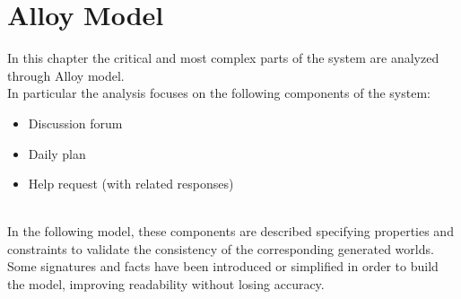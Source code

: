 \section{Alloy Model}

In this chapter the critical and most complex parts of the system are analyzed through Alloy model.\\
In particular the analysis focuses on the following components of the system: 
\begin{itemize}
    \item Discussion forum
    \item Daily plan
    \item Help request (with related responses)
\end{itemize} \\
In the following model, these components are described specifying properties and constraints to validate the consistency of the corresponding generated worlds.\\
Some signatures and facts have been introduced or simplified in order to build the model, improving readability without losing accuracy.






